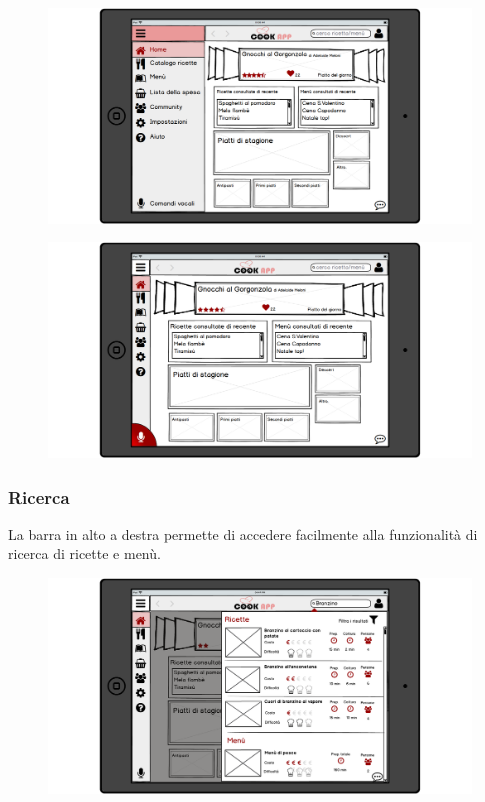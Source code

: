 \begin{figure}[H]
	\centering
	\includegraphics[width=0.95\linewidth]{img/mockup/Homepage-menu.png}
\end{figure}
\begin{figure}[H]
	\centering
	\includegraphics[width=0.95\linewidth]{img/mockup/Homepage-microphone.png}
\end{figure}

\subsubsection{Ricerca}
La barra in alto a destra permette di accedere facilmente alla
funzionalità di ricerca di ricette e menù.
\begin{figure}[H]
	\centering
	\includegraphics[width=0.95\linewidth]{img/mockup/ricerca.png}
\end{figure}


